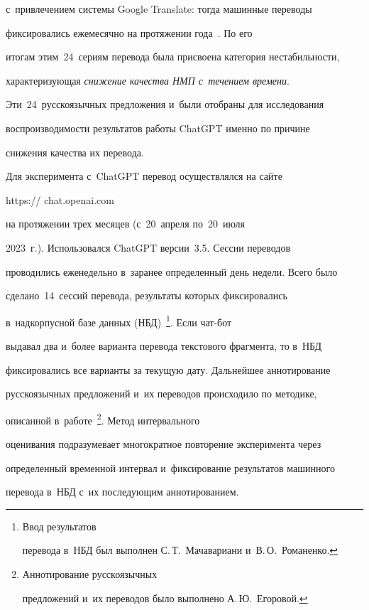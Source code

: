 с~привлечением сис\-те\-мы \mbox{Google} Translate: тогда машинные переводы 


фиксировались ежемесячно на протяжении года~\cite{21-eg, 22-eg}. По его 


итогам этим~24~сериям перевода была присвоена категория не\-ста\-биль\-ности, 


ха\-рак\-те\-ри\-зу\-ющая \textit{снижение качества НМП с~течением времени}. 


Эти~24~русскоязычных предложения и~были отоб\-ра\-ны для исследования 


вос\-про\-из\-во\-ди\-мости результатов работы \mbox{ChatGPT} именно по причине 


снижения качества их пе\-ре\-вода.


   


   Для эксперимента с~ChatGPT перевод осуществлялся на сай\-те {\sf 


https:// chat.openai.com} на протяжении трех месяцев (с~20~апреля по~20~июля 


2023~г.). Использовался \mbox{ChatGPT} вер\-сии~3.5. Сессии переводов 


проводились еженедельно в~заранее определенный день недели. Всего было 


сделано~14~сессий перевода, результаты которых фиксировались 


в~надкорпусной базе данных (НБД)~\cite{23-eg}\footnote{Ввод результатов 


перевода в~НБД был выполнен С.\,Т.~Мачавариани и~В.\,О.~Романенко.}. Если чат-бот 


выдавал два и~более варианта перевода текс\-то\-во\-го фрагмента, то в~НБД 


фиксировались все варианты за текущую дату. Дальнейшее аннотирование 


русскоязычных предложений и~их переводов происходило по методике, 


описанной в~работе~\cite{13-eg}\footnote{Аннотирование русскоязычных 


предложений и~их переводов было выполнено А.\,Ю.~Егоровой.}. Метод интервального 


оценивания подра\-зуме\-ва\-ет мно\-го\-крат\-ное повторение эксперимента через 


определенный временной интервал и~фиксирование результатов машинного 


перевода в~НБД с~их по\-сле\-ду\-ющим ан\-но\-ти\-ро\-ва\-нием. 



